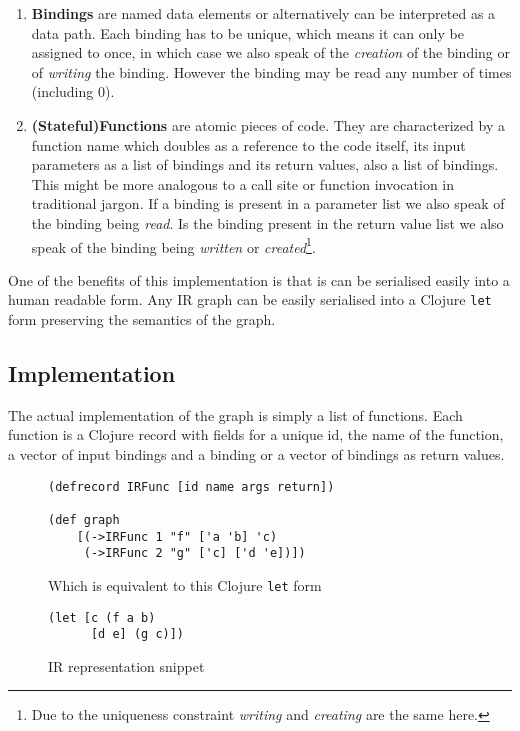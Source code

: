 \begin{enumerate}
    \item \textbf{Bindings} are named data elements or alternatively can be interpreted as a data path. Each binding has to be unique, which means it can only be assigned to once, in which case we also speak of the \textit{creation} of the binding or of \textit{writing} the binding. However the binding may be read any number of times (including 0).
    \item \textbf{(Stateful)Functions} are atomic pieces of code. They are characterized by a function name which doubles as a reference to the code itself, its input parameters as a list of bindings and its return values, also a list of bindings.
    This might be more analogous to a call site or function invocation in traditional jargon.
    If a binding is present in a parameter list we also speak of the binding being \textit{read}.
    Is the binding present in the return value list we also speak of the binding being \textit{written} or \textit{created}\footnote{Due to the uniqueness constraint \textit{writing} and \textit{creating} are the same here.}.
\end{enumerate}

One of the benefits of this implementation is that is can be serialised easily into a human readable form.
Any IR graph can be easily serialised into a Clojure \texttt{let} form preserving the semantics of the graph.

\subsection{Implementation}

The actual implementation of the graph is simply a list of functions. Each function is a Clojure record with fields for a unique id, the name of the function, a vector of input bindings and a binding or a vector of bindings as return values.

\begin{figure}
\begin{verbatim}
(defrecord IRFunc [id name args return])

(def graph
	[(->IRFunc 1 "f" ['a 'b] 'c)
	 (->IRFunc 2 "g" ['c] ['d 'e])])

\end{verbatim}
Which is equivalent to this Clojure \texttt{let} form
\begin{verbatim}
(let [c (f a b)
      [d e] (g c)])
\end{verbatim}
\caption{IR representation snippet}
\end{figure}

